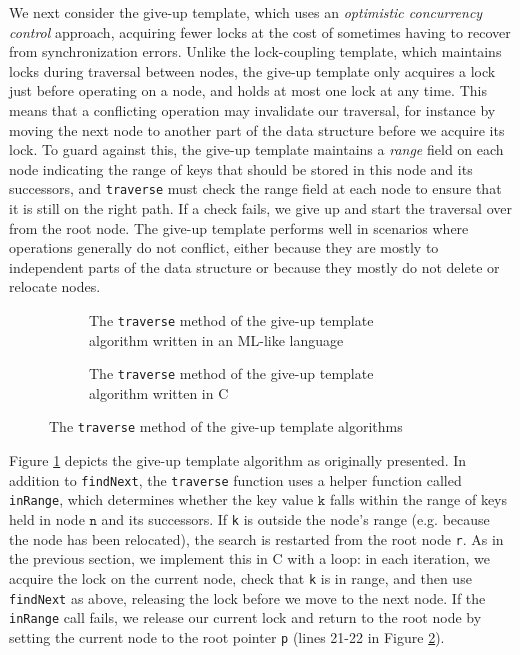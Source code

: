 \documentclass[a4paper,UKenglish,cleveref, autoref, thm-restate]{lipics-v2021}
\begin{document}
We next consider the give-up template, which uses an \emph{optimistic concurrency control} approach, acquiring fewer locks at the cost of sometimes having to recover from synchronization errors. Unlike the lock-coupling template, which maintains locks during traversal between nodes, the give-up template only acquires a lock just before operating on a node, and holds at most one lock at any time. This means that a conflicting operation may invalidate our traversal, for instance by moving the next node to another part of the data structure before we acquire its lock. To guard against this, the give-up template maintains a \emph{range} field on each node indicating the range of keys that should be stored in this node and its successors, and \lstinline{traverse} must check the range field at each node to ensure that it is still on the right path. If a check fails, we give up and start the traversal over from the root node. The give-up template performs well in scenarios where operations generally do not conflict, either because they are mostly to independent parts of the data structure or because they mostly do not delete or relocate nodes.

\begin{figure}[!ht]
	\begin{subfigure}[t]{0.45\textwidth}
		 
		\caption{The \lstinline{traverse} method of the give-up template algorithm written in an ML-like language}
		\label{traverse_giveup_a}	
	\end{subfigure}\qquad
	\begin{subfigure}[t]{0.48\textwidth}
		 
		\caption{The \lstinline{traverse} method of the give-up template algorithm written in C}
		\label{traverse_giveup_b}
	\end{subfigure}
	\caption{The \lstinline{traverse} method of the give-up template algorithms}
	\label{traverse_giveup}
\end{figure}

Figure \ref{traverse_giveup_a} depicts the give-up template algorithm as originally presented. In addition to \lstinline{findNext}, the \lstinline{traverse} function uses a helper function called \lstinline{inRange}, which determines whether the key value $\texttt{k}$ falls within the range of keys held in node $\texttt{n}$ and its successors. If \lstinline{k} is outside the node's range (e.g. because the node has been relocated), the search is restarted from the root node \lstinline{r}. As in the previous section, we implement this in C with a loop: in each iteration, we acquire the lock on the current node, check that \lstinline{k} is in range, and then use \lstinline{findNext} as above, releasing the lock before we move to the next node. If the \lstinline{inRange} call fails, we release our current lock and return to the root node by setting the current node to the root pointer \lstinline{p} (lines 21-22 in Figure \ref{traverse_giveup_b}).
\end{document}
